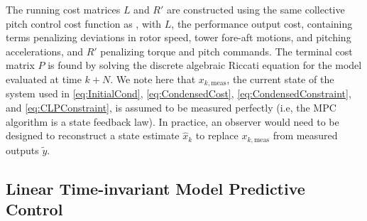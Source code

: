 \documentclass[letterpaper, 10 pt, conference]{ieeeconf}  %
\newcommand{\tran}{^{\mathsf{T}}}
\begin{document}
The running cost matrices $L$ and $R'$ are constructed using the same collective pitch control cost function as \cite{Sinner2018}, with $L$, the performance output cost, containing terms penalizing deviations in rotor speed, tower fore-aft motions, and pitching accelerations, and $R'$ penalizing torque and pitch commands. The terminal cost matrix $P$ is found by solving the discrete algebraic Riccati equation \cite{Rawlings2000} for the model evaluated at time $k+N$.
We note here that $x_{k,\mathrm{meas}}$, the current state of the system used in \eqref{eq:InitialCond}, \eqref{eq:CondensedCost}, \eqref{eq:CondensedConstraint}, and \eqref{eq:CLPConstraint}, is assumed to be measured perfectly (i.e, the MPC algorithm is a state feedback law). In practice, an observer would need to be designed to reconstruct a state estimate $\hat{x}_k$ to replace $x_{k,\mathrm{meas}}$ from measured outputs $\tilde{y}$.

\subsection{Linear Time-invariant Model Predictive Control}
\end{document}
